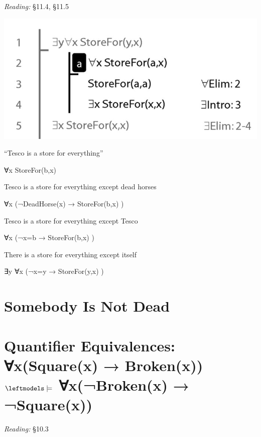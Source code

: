 \documentclass[12pt]{extarticle}
\begin{document}
\begin{multicols*}{3}
\emph{Reading:} §11.4, §11.5
 
\begin{center}
\includegraphics[scale=0.3]{img/unit_565_proof.png}
\end{center}
“Tesco is a store for everything”
 
\hspace{3mm} ∀x StoreFor(b,x)
 
Tesco is a store for everything except dead horses
 
\hspace{3mm} ∀x (¬DeadHorse(x) → StoreFor(b,x) )
 
Tesco is a store for everything except Tesco
 
\hspace{3mm} ∀x (¬x=b → StoreFor(b,x) )
 
There is a store for everything except itself
 
\hspace{3mm} ∃y ∀x (¬x=y → StoreFor(y,x) )
 
 
 
\section{Somebody Is Not Dead}
 
 
 
\section{Quantifier Equivalences: ∀x(Square(x) → Broken(x)) $\leftmodels\models$ ∀x(¬Broken(x) → ¬Square(x))}
 
\emph{Reading:} §10.3
 

\end{multicols*}
\end{document}

